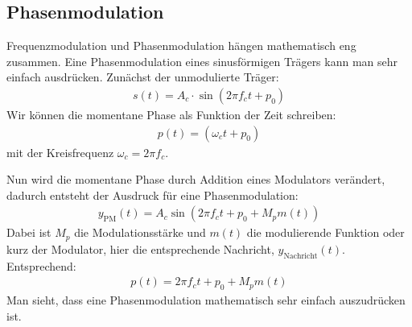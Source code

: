 \documentclass[letterpaper,10pt,english]{jupyterBook}
\begin{document}
\subsection{Phasenmodulation}
\label{\detokenize{content/3_Modulationen:phasenmodulation}}
\sphinxAtStartPar
Frequenzmodulation und Phasenmodulation hängen mathematisch eng zusammen. Eine Phasenmodulation eines sinusförmigen Trägers kann man sehr einfach ausdrücken. Zunächst der unmodulierte Träger:
\begin{equation*}
\begin{split} s(t) = A_c \cdot \sin(2\pi f_c t + p_0)\end{split}
\end{equation*}
\sphinxAtStartPar
Wir können die momentane Phase als Funktion der Zeit schreiben:
\begin{equation*}
\begin{split} p(t)=(\omega_{c}t+p_{0}) \end{split}
\end{equation*}
\sphinxAtStartPar
mit der Kreisfrequenz \(\omega_c = 2 \pi f_c\).

\sphinxAtStartPar
Nun wird die momentane Phase durch Addition eines Modulators verändert, dadurch entsteht der Ausdruck für eine Phasenmodulation:
\begin{equation*}
\begin{split} y_\mathrm{PM}(t)= A_c \sin\left(2\pi f_c t  +p_0 + M_p m(t)\right)\end{split}
\end{equation*}
\sphinxAtStartPar
Dabei ist \(M_{p}\) die Modulationsstärke und \(m(t)\) die modulierende Funktion oder kurz der Modulator, hier die entsprechende Nachricht, \(y_\mathrm{Nachricht}(t)\). Entsprechend:
\begin{equation*}
\begin{split} p(t)=2\pi f_c t+p_{0}+M_{p}m(t)\end{split}
\end{equation*}
\sphinxAtStartPar
Man sieht, dass eine Phasenmodulation mathematisch sehr einfach auszudrücken ist.
\end{document}
